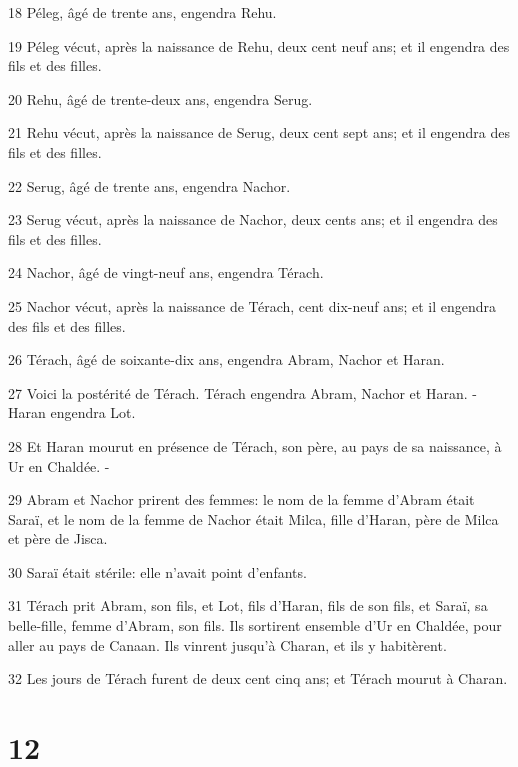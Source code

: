 \par 18 Péleg, âgé de trente ans, engendra Rehu.
\par 19 Péleg vécut, après la naissance de Rehu, deux cent neuf ans; et il engendra des fils et des filles.
\par 20 Rehu, âgé de trente-deux ans, engendra Serug.
\par 21 Rehu vécut, après la naissance de Serug, deux cent sept ans; et il engendra des fils et des filles.
\par 22 Serug, âgé de trente ans, engendra Nachor.
\par 23 Serug vécut, après la naissance de Nachor, deux cents ans; et il engendra des fils et des filles.
\par 24 Nachor, âgé de vingt-neuf ans, engendra Térach.
\par 25 Nachor vécut, après la naissance de Térach, cent dix-neuf ans; et il engendra des fils et des filles.
\par 26 Térach, âgé de soixante-dix ans, engendra Abram, Nachor et Haran.
\par 27 Voici la postérité de Térach. Térach engendra Abram, Nachor et Haran. -Haran engendra Lot.
\par 28 Et Haran mourut en présence de Térach, son père, au pays de sa naissance, à Ur en Chaldée. -
\par 29 Abram et Nachor prirent des femmes: le nom de la femme d'Abram était Saraï, et le nom de la femme de Nachor était Milca, fille d'Haran, père de Milca et père de Jisca.
\par 30 Saraï était stérile: elle n'avait point d'enfants.
\par 31 Térach prit Abram, son fils, et Lot, fils d'Haran, fils de son fils, et Saraï, sa belle-fille, femme d'Abram, son fils. Ils sortirent ensemble d'Ur en Chaldée, pour aller au pays de Canaan. Ils vinrent jusqu'à Charan, et ils y habitèrent.
\par 32 Les jours de Térach furent de deux cent cinq ans; et Térach mourut à Charan.

\chapter{12}

